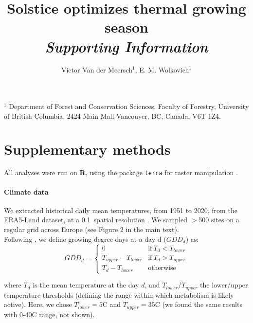 \documentclass[11pt,letter]{article}
\begin{document}
\title{Solstice optimizes thermal growing season\\\emph{Supporting Information}}

\author{Victor Van der Meersch$^{1}$, E. M. Wolkovich$^{1}$}
\date{}
\maketitle 

$^1$ Department of Forest and Conservation Sciences, Faculty of Forestry, University of British Columbia, 2424 Main Mall
Vancouver, BC, Canada, V6T 1Z4. \\

\section*{Supplementary methods} %

All analyses were run on \textbf{\textsf{R}}, using the package \texttt{terra} for raster manipulation \citep{Hijmans2024}.

\paragraph{Climate data}
We extracted historical daily mean temperatures, from 1951 to 2020, from the ERA5-Land dataset, at a 0.1\degree~spatial resolution \citep{MunozSabater2021}. We sampled $>$500 sites on a regular grid across Europe (see Figure 2 in the main text).\\
Following \citet{McMaster1997}, we define growing degree-days at a day d ($GDD_d$) as:
\begin{equation}
GDD_d =
\begin{cases}
    0 & \text{if}~T_d<T_{lower}\\
    T_{upper}-T_{lower} & \text{if}~T_d>T_{upper}\\
    T_d-T_{lower} & \text{otherwise}
\end{cases}       
\end{equation}

\noindent where $T_d$ is the mean temperature at the day $d$, and $T_{lower}$/$T_{upper}$ the lower/upper temperature thresholds (defining the range within which metabolism is likely active). Here, we chose $T_{lower}=5$\degree C and $T_{upper}=35$\degree C (we found the same results with 0-40\degree C range, not shown).
\end{document}
